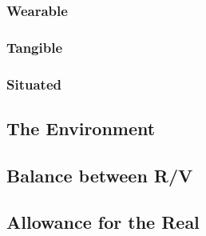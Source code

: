 \subsubsection{Wearable}
\subsubsection{Tangible}
\subsubsection{Situated}

\subsection{The Environment}
\subsection{Balance between R/V}
\subsection{Allowance for the Real}
